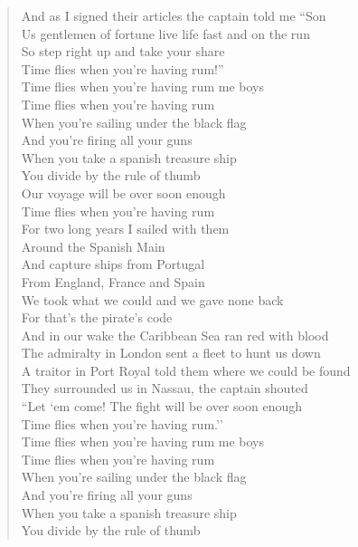 \documentclass[11pt]{article}
\begin{document}
\begin{verse}
And as I signed their articles the captain told me ``Son\\
Us gentlemen of fortune live life fast and on the run\\
So step right up and take your share\\
Time flies when you're having rum!''\\
\vspace*{1em}
Time flies when you're having rum me boys\\
Time flies when you're having rum\\
When you're sailing under the black flag\\
And you're firing all your guns\\
When you take a spanish treasure ship\\
You divide by the rule of thumb\\
Our voyage will be over soon enough\\
Time flies when you're having rum\\
For two long years I sailed with them\\
Around the Spanish Main\\
And capture ships from Portugal\\
From England, France and Spain\\
We took what we could and we gave none back\\
For that's the pirate's code\\
And in our wake the Caribbean Sea ran red with blood\\
\vspace*{1em}
The admiralty in London sent a fleet to hunt us down\\
A traitor in Port Royal told them where we could be found\\
They surrounded us in Nassau, the captain shouted\\
``Let `em come! The fight will be over soon enough\\
Time flies when you're having rum.''\\
\vspace*{1em}
\vspace*{1em}
Time flies when you're having rum me boys\\
Time flies when you're having rum\\
When you're sailing under the black flag\\
And you're firing all your guns\\
When you take a spanish treasure ship\\
You divide by the rule of thumb\\

\end{verse}
\end{document}
